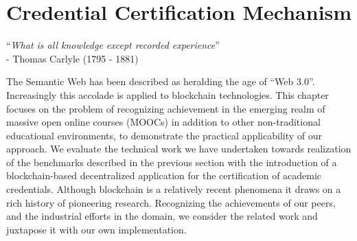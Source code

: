 \chapter{Credential Certification Mechanism\label{cha:chapter3}}

\begin{displayquote}
``\textit{What is all knowledge except recorded experience}'' \\- Thomas Carlyle (1795 - 1881)
\end{displayquote}

The Semantic Web has been described as heralding the age of ``Web 3.0''. 
Increasingly this accolade is applied to blockchain technologies.
This chapter focuses on the problem of recognizing achievement in the emerging realm of massive open online courses (MOOCs) in addition to other non-traditional educational environments, to demonstrate the practical applicability of our approach. 
We evaluate the technical work we have undertaken towards realization of the benchmarks described in the previous section with the introduction of a blockchain-based decentralized application for the certification of academic credentials. 
Although blockchain is a relatively recent phenomena it draws on a rich history of pioneering research. Recognizing the achievements of our peers, and the industrial efforts in the domain, we consider the related work and juxtapose it with our own implementation.


